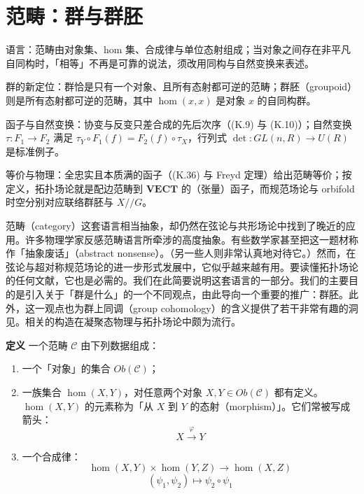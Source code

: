 \section{范畴：群与群胚} %

\begin{keytakeaways}
  \item 语言：范畴由对象集、hom 集、合成律与单位态射组成；当对象之间存在非平凡自同构时，「相等」不再是可靠的说法，须改用同构与自然变换来表述。
  \item 群的新定位：群恰是只有一个对象、且所有态射都可逆的范畴；群胚（groupoid）则是所有态射都可逆的范畴，其中 $\hom(x,x)$ 是对象 $x$ 的自同构群。
  \item 函子与自然变换：协变与反变只差合成的先后次序（(K.9) 与 (K.10)）；自然变换 $\tau:F_1\to F_2$ 满足 $\tau_Y\circ F_1(f)=F_2(f)\circ\tau_X$，行列式 $\det:GL(n,R)\to U(R)$ 是标准例子。
  \item 等价与物理：全忠实且本质满的函子（(K.36) 与 Freyd 定理）给出范畴等价；按定义，拓扑场论就是配边范畴到 $\mathbf{VECT}$ 的（张量）函子，而规范场论与 orbifold 时空分别对应联络群胚与 $X/\!/G$。
\end{keytakeaways}

范畴（category）这套语言相当抽象，却仍然在弦论与共形场论中找到了晚近的应用。许多物理学家反感范畴语言所牵涉的高度抽象。有些数学家甚至把这一题材称作「抽象废话」（abstract nonsense）。（另一些人则非常认真地对待它。）然而，在弦论与超对称规范场论的进一步形式发展中，它似乎越来越有用。要读懂拓扑场论的任何文献，它也是必需的。我们在此简要说明这套语言的一部分。我们的主要目的是引入关于「群是什么」的一个不同观点，由此导向一个重要的推广：群胚。此外，这一观点也为群上同调（group cohomology）的含义提供了若干非常有趣的洞见。相关的构造在凝聚态物理与拓扑场论中颇为流行。

\textbf{定义} 一个范畴 $\mathcal{C}$ 由下列数据组成：

\begin{enumerate}[label=\alph*.)]
  \item 一个「对象」的集合 $\mathit{Ob}(\mathcal{C})$；
  \item 一族集合 $\hom(X,Y)$，对任意两个对象 $X,Y\in\mathit{Ob}(\mathcal{C})$ 都有定义。$\hom(X,Y)$ 的元素称为「从 $X$ 到 $Y$ 的态射（morphism）」。它们常被写成箭头：
  \begin{equation}
  X\xrightarrow{\ \varphi\ }Y
  \tag{K.1}
  \label{eq:K.1}
  \end{equation}
  \item 一个合成律：
  \begin{equation}
  \hom(X,Y)\times\hom(Y,Z)\to\hom(X,Z)
  \tag{K.2}
  \label{eq:K.2}
  \end{equation}
  \begin{equation}
  (\psi_1,\psi_2)\mapsto\psi_2\circ\psi_1
  \tag{K.3}
  \label{eq:K.3}
  \end{equation}
\end{enumerate}

